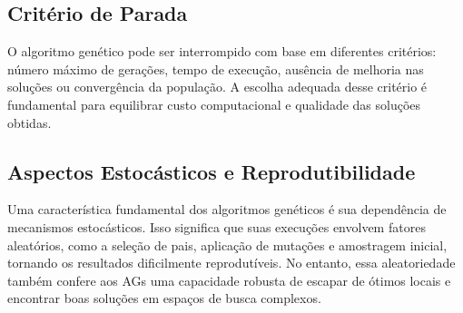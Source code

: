 

\subsection{Critério de Parada}

O algoritmo genético pode ser interrompido com base em diferentes critérios: número máximo de gerações, tempo de execução, ausência de melhoria nas soluções ou convergência da população. A escolha adequada desse critério é fundamental para equilibrar custo computacional e qualidade das soluções obtidas.

\subsection{Aspectos Estocásticos e Reprodutibilidade}

Uma característica fundamental dos algoritmos genéticos é sua dependência de mecanismos estocásticos. Isso significa que suas execuções envolvem fatores aleatórios, como a seleção de pais, aplicação de mutações e amostragem inicial, tornando os resultados dificilmente reprodutíveis. No entanto, essa aleatoriedade também confere aos AGs uma capacidade robusta de escapar de ótimos locais e encontrar boas soluções em espaços de busca complexos.

